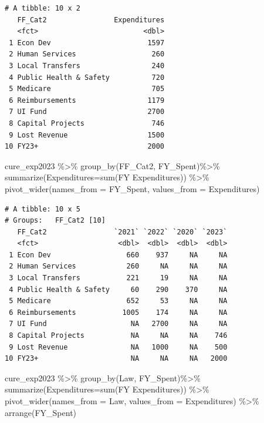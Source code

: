 \documentclass[
  letterpaper,
  DIV=11,
  numbers=noendperiod]{scrreport}
\newenvironment{Shaded}{\begin{snugshade}}{\end{snugshade}}
\newcommand{\AttributeTok}[1]{\textcolor[rgb]{0.40,0.45,0.13}{#1}}
\newcommand{\FunctionTok}[1]{\textcolor[rgb]{0.28,0.35,0.67}{#1}}
\newcommand{\NormalTok}[1]{\textcolor[rgb]{0.00,0.23,0.31}{#1}}
\newcommand{\SpecialCharTok}[1]{\textcolor[rgb]{0.37,0.37,0.37}{#1}}
\newcommand{\StringTok}[1]{\textcolor[rgb]{0.13,0.47,0.30}{#1}}
\begin{document}
\begin{verbatim}
# A tibble: 10 x 2
   FF_Cat2                Expenditures
   <fct>                         <dbl>
 1 Econ Dev                       1597
 2 Human Services                  260
 3 Local Transfers                 240
 4 Public Health & Safety          720
 5 Medicare                        705
 6 Reimbursements                 1179
 7 UI Fund                        2700
 8 Capital Projects                746
 9 Lost Revenue                   1500
10 FY23+                          2000
\end{verbatim}

\begin{Shaded}
\begin{Highlighting}[]
\NormalTok{cure\_exp2023 }\SpecialCharTok{\%\textgreater{}\%}
  \FunctionTok{group\_by}\NormalTok{(FF\_Cat2, FY\_Spent)}\SpecialCharTok{\%\textgreater{}\%} 
  \FunctionTok{summarize}\NormalTok{(}\AttributeTok{Expenditures=}\FunctionTok{sum}\NormalTok{(}\StringTok{\textasciigrave{}}\AttributeTok{FY Expenditures}\StringTok{\textasciigrave{}}\NormalTok{)) }\SpecialCharTok{\%\textgreater{}\%}
  \FunctionTok{pivot\_wider}\NormalTok{(}\AttributeTok{names\_from =}\NormalTok{ FY\_Spent, }\AttributeTok{values\_from =}\NormalTok{ Expenditures)}
\end{Highlighting}
\end{Shaded}

\begin{verbatim}
# A tibble: 10 x 5
# Groups:   FF_Cat2 [10]
   FF_Cat2                `2021` `2022` `2020` `2023`
   <fct>                   <dbl>  <dbl>  <dbl>  <dbl>
 1 Econ Dev                  660    937     NA     NA
 2 Human Services            260     NA     NA     NA
 3 Local Transfers           221     19     NA     NA
 4 Public Health & Safety     60    290    370     NA
 5 Medicare                  652     53     NA     NA
 6 Reimbursements           1005    174     NA     NA
 7 UI Fund                    NA   2700     NA     NA
 8 Capital Projects           NA     NA     NA    746
 9 Lost Revenue               NA   1000     NA    500
10 FY23+                      NA     NA     NA   2000
\end{verbatim}

\begin{Shaded}
\begin{Highlighting}[]
\NormalTok{cure\_exp2023 }\SpecialCharTok{\%\textgreater{}\%} 
  \FunctionTok{group\_by}\NormalTok{(Law, FY\_Spent)}\SpecialCharTok{\%\textgreater{}\%} 
  \FunctionTok{summarize}\NormalTok{(}\AttributeTok{Expenditures=}\FunctionTok{sum}\NormalTok{(}\StringTok{\textasciigrave{}}\AttributeTok{FY Expenditures}\StringTok{\textasciigrave{}}\NormalTok{)) }\SpecialCharTok{\%\textgreater{}\%}
  \FunctionTok{pivot\_wider}\NormalTok{(}\AttributeTok{names\_from =}\NormalTok{ Law, }\AttributeTok{values\_from =}\NormalTok{ Expenditures) }\SpecialCharTok{\%\textgreater{}\%} 
  \FunctionTok{arrange}\NormalTok{(FY\_Spent)}
\end{Highlighting}
\end{Shaded}
\end{document}
